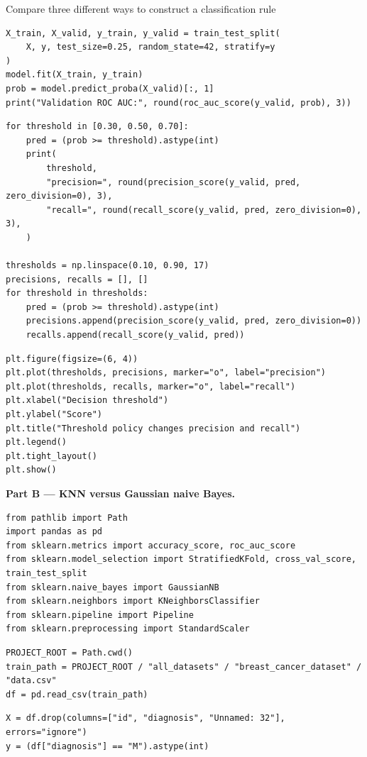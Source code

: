 \begin{labproject}{Compare three different ways to construct a classification rule}
\begin{lstlisting}[style=mlpython]
X_train, X_valid, y_train, y_valid = train_test_split(
    X, y, test_size=0.25, random_state=42, stratify=y
)
model.fit(X_train, y_train)
prob = model.predict_proba(X_valid)[:, 1]
print("Validation ROC AUC:", round(roc_auc_score(y_valid, prob), 3))
\end{lstlisting}

\begin{lstlisting}[style=mlpython]
for threshold in [0.30, 0.50, 0.70]:
    pred = (prob >= threshold).astype(int)
    print(
        threshold,
        "precision=", round(precision_score(y_valid, pred, zero_division=0), 3),
        "recall=", round(recall_score(y_valid, pred, zero_division=0), 3),
    )

thresholds = np.linspace(0.10, 0.90, 17)
precisions, recalls = [], []
for threshold in thresholds:
    pred = (prob >= threshold).astype(int)
    precisions.append(precision_score(y_valid, pred, zero_division=0))
    recalls.append(recall_score(y_valid, pred))
\end{lstlisting}

\begin{lstlisting}[style=mlpython]
plt.figure(figsize=(6, 4))
plt.plot(thresholds, precisions, marker="o", label="precision")
plt.plot(thresholds, recalls, marker="o", label="recall")
plt.xlabel("Decision threshold")
plt.ylabel("Score")
plt.title("Threshold policy changes precision and recall")
plt.legend()
plt.tight_layout()
plt.show()
\end{lstlisting}

\medskip\noindent\textbf{Part B --- KNN versus Gaussian naive Bayes.}\par
\begin{lstlisting}[style=mlpython]
from pathlib import Path
import pandas as pd
from sklearn.metrics import accuracy_score, roc_auc_score
from sklearn.model_selection import StratifiedKFold, cross_val_score, train_test_split
from sklearn.naive_bayes import GaussianNB
from sklearn.neighbors import KNeighborsClassifier
from sklearn.pipeline import Pipeline
from sklearn.preprocessing import StandardScaler
\end{lstlisting}

\begin{lstlisting}[style=mlpython]
PROJECT_ROOT = Path.cwd()
train_path = PROJECT_ROOT / "all_datasets" / "breast_cancer_dataset" / "data.csv"
df = pd.read_csv(train_path)
\end{lstlisting}

\begin{lstlisting}[style=mlpython]
X = df.drop(columns=["id", "diagnosis", "Unnamed: 32"], errors="ignore")
y = (df["diagnosis"] == "M").astype(int)


\end{lstlisting}
\end{labproject}
